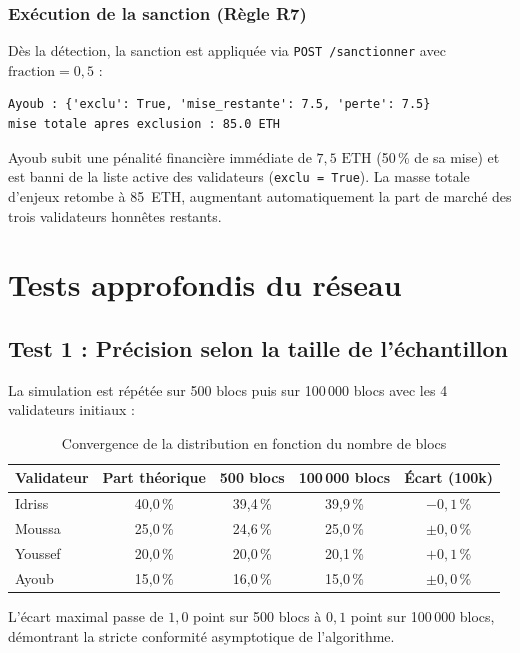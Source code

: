 \documentclass[11pt,a4paper]{article}
\begin{document}
\subsubsection*{Exécution de la sanction (Règle R7)}
Dès la détection, la sanction est appliquée via \texttt{POST /sanctionner} avec $\text{fraction} = 0{,}5$ :
\begin{lstlisting}
Ayoub : {'exclu': True, 'mise_restante': 7.5, 'perte': 7.5}
mise totale apres exclusion : 85.0 ETH
\end{lstlisting}
Ayoub subit une pénalité financière immédiate de $7{,}5\text{ ETH}$ (50\,\% de sa mise) et est banni de la liste active des validateurs (\texttt{exclu = True}). La masse totale d'enjeux retombe à 85~ETH, augmentant automatiquement la part de marché des trois validateurs honnêtes restants.

\section{Tests approfondis du réseau}

\subsection{Test 1 : Précision selon la taille de l'échantillon}
La simulation est répétée sur 500 blocs puis sur 100\,000 blocs avec les 4 validateurs initiaux :

\begin{table}[H]
\centering
\begin{tabular}{@{}lcccc@{}}
\toprule
\textbf{Validateur} & \textbf{Part théorique} & \textbf{500 blocs} & \textbf{100\,000 blocs} & \textbf{Écart (100k)} \\
\midrule
Idriss  & 40,0\,\% & 39,4\,\% & 39,9\,\% & $-0{,}1\,\%$ \\
Moussa  & 25,0\,\% & 24,6\,\% & 25,0\,\% & $\pm 0{,}0\,\%$ \\
Youssef & 20,0\,\% & 20,0\,\% & 20,1\,\% & $+0{,}1\,\%$ \\
Ayoub   & 15,0\,\% & 16,0\,\% & 15,0\,\% & $\pm 0{,}0\,\%$ \\
\bottomrule
\end{tabular}
\caption{Convergence de la distribution en fonction du nombre de blocs}
\label{tab:convergence_test}
\end{table}

L'écart maximal passe de $1{,}0$ point sur 500 blocs à $0{,}1$ point sur 100\,000 blocs, démontrant la stricte conformité asymptotique de l'algorithme.
\end{document}
